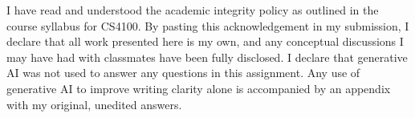 \documentclass[a4paper]{article}
\begin{document}
\begin{sloppypar}
\begin{enumerate}[start=12,label=Q\arabic*,left=0pt]
    \par I have read and understood the academic integrity policy as outlined in the course syllabus for CS4100. 
    By pasting this acknowledgement in my submission, I declare that all work presented here is my own, and any conceptual 
    discussions I may have had with classmates have been fully disclosed. I declare that generative AI was not used to answer
    any questions in this assignment. Any use of generative AI to improve writing clarity alone is accompanied by an appendix 
    with my original, unedited answers.

\end{enumerate}

\end{sloppypar}



\end{document}
